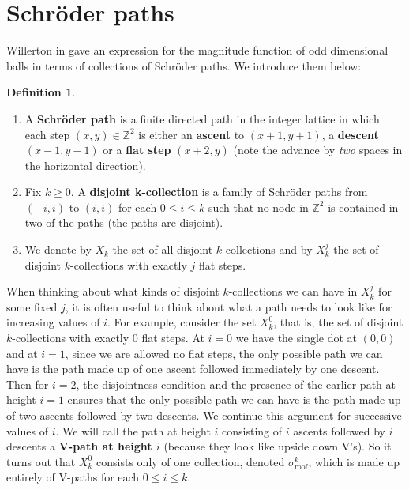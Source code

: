 \documentclass[11pt]{article}
\newcommand{\Z}{\mathbb{Z}}
\theoremstyle{definition}
\newtheorem*{defn}{Definition}
\theoremstyle{definition}
\theoremstyle{plain}
\theoremstyle{plain}
\theoremstyle{plain}
\theoremstyle{definition}
\begin{document}
\section{Schröder paths}

Willerton in \cite{willerton_magnitude_2017} gave an expression for the magnitude function of odd dimensional balls in terms of collections of Schröder paths. We introduce them below:
\begin{defn}
\begin{enumerate}[label=$\bullet$]
\item A \textbf{Schröder path} is a finite directed path in the integer lattice in which each step $(x,y)\in\Z^2$ is either an \textbf{ascent} to $(x+1,y+1)$, a \textbf{descent} $(x-1,y-1)$ or a \textbf{flat step} $(x+2,y)$ (note the advance by \emph{two} spaces in the horizontal direction).
\item Fix $k\geq0$. A \textbf{disjoint k-collection} is a family of Schröder paths from $(-i,i)$ to $(i,i)$ for each $0\leq i\leq k$ such that no node in $\Z^2$ is contained in two of the paths (the paths are disjoint).
\item We denote by $X_k$ the set of all disjoint $k$-collections and by $X_k^j$ the set of disjoint $k$-collections with exactly $j$ flat steps.
\end{enumerate}
\end{defn}

When thinking about what kinds of disjoint $k$-collections we can have in $X_k^j$ for some fixed $j$, it is often useful to think about what a path needs to look like for increasing values of $i$. For example, consider the set $X_k^0$, that is, the set of disjoint $k$-collections with exactly 0 flat steps. At $i = 0$ we have the single dot at $(0,0)$ and at $i = 1$, since we are allowed no flat steps, the only possible path we can have is the path made up of one ascent followed immediately by one descent. Then for $i = 2$, the disjointness condition and the presence of the earlier path at height $i=1$ ensures that the only possible path we can have is the path made up of two ascents followed by two descents. We continue this argument for successive values of $i$. We will call the path at height $i$ consisting of $i$ ascents followed by $i$ descents a \textbf{V-path at height $i$} (because they look like upside down V's). So it turns out that $X_k^0$ consists only of one collection, denoted $\sigma_{\text{roof}}^k$, which is made up entirely of V-paths for each $0\leq i\leq k$.
\end{document}
